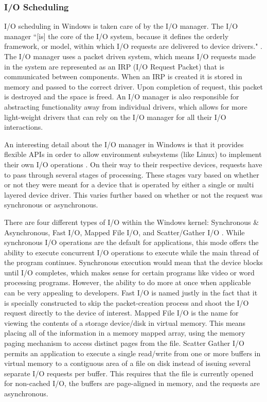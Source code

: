 \documentclass[10pt,draftclsnofoot,onecolumn]{IEEEtran}
\begin{document}
\subsubsection{I/O Scheduling}
\label{sub:IOScheduling Windows}
\par I/O scheduling in Windows is taken care of by the I/O manager.
The I/O manager ``[is] the core of the I/O system, because it defines the orderly framework, or model, within which I/O requests are delivered to device drivers." \cite{win:2}.
The I/O manager uses a packet driven system, which means I/O requests made in the system are represented as an IRP (I/O Request Packet) that is communicated between components.
When an IRP is created it is stored in memory and passed to the correct driver.
Upon completion of request, this packet is destroyed and the space is freed.
An I/O manager is also responsible for abstracting functionality away from individual drivers, which allows for more light-weight drivers that can rely on the I/O manager for all their I/O interactions.

\par An interesting detail about the I/O manager in Windows is that it provides flexible APIs in order to allow environment subsystems (like Linux) to implement their own I/O operations \cite{win:2}.
On their way to their respective devices, requests have to pass through several stages of processing.
These stages vary based on whether or not they were meant for a device that is operated by either a single or multi layered device driver.
This varies further based on whether or not the request was synchronous or asynchronous.

\par There are four different types of I/O within the Windows kernel: Synchronous \& Asynchronous, Fast I/O, Mapped File I/O, and Scatter/Gather I/O \cite{win:2}.
While synchronous I/O operations are the default for applications, this mode offers the ability to execute concurrent I/O operations to execute while the main thread of the program continues.
Synchronous execution would mean that the device blocks until I/O completes, which makes sense for certain programs like video or word processing programs.
However, the ability to do more at once when applicable can be very appealing to developers.
Fast I/O is named justly in the fact that it is specially constructed to skip the packet-creation process and shoot the I/O request directly to the device of interest.
Mapped File I/O is the name for viewing the contents of a storage device/disk in virtual memory.
This means placing all of the information in a memory mapped array, using the memory paging mechanism to access distinct pages from the file.
Scatter Gather I/O permits an application to execute a single read/write from one or more buffers in virtual memory to a contiguous area of a file on disk instead of issuing several separate I/O requests per buffer.
This requires that the file is currently opened for non-cached I/O, the buffers are page-aligned in memory, and the requests are asynchronous.
\end{document}
